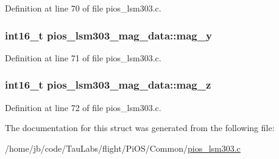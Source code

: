 \-Definition at line 70 of file pios\-\_\-lsm303.\-c.

\hypertarget{structpios__lsm303__mag__data_a3365812478c4eab5da066f69f10ceacf}{
\subsubsection[{mag\-\_\-y}]{\setlength{\rightskip}{0pt plus 5cm}int16\-\_\-t {\bf pios\-\_\-lsm303\-\_\-mag\-\_\-data\-::mag\-\_\-y}}}\label{structpios__lsm303__mag__data_a3365812478c4eab5da066f69f10ceacf}


\-Definition at line 71 of file pios\-\_\-lsm303.\-c.

\hypertarget{structpios__lsm303__mag__data_a2989fa1111551a8ec9135c7446bb0a03}{
\subsubsection[{mag\-\_\-z}]{\setlength{\rightskip}{0pt plus 5cm}int16\-\_\-t {\bf pios\-\_\-lsm303\-\_\-mag\-\_\-data\-::mag\-\_\-z}}}\label{structpios__lsm303__mag__data_a2989fa1111551a8ec9135c7446bb0a03}


\-Definition at line 72 of file pios\-\_\-lsm303.\-c.



\-The documentation for this struct was generated from the following file\-:\begin{DoxyCompactItemize}
\item 
/home/jb/code/\-Tau\-Labs/flight/\-Pi\-O\-S/\-Common/\hyperlink{pios__lsm303_8c}{pios\-\_\-lsm303.\-c}\end{DoxyCompactItemize}
